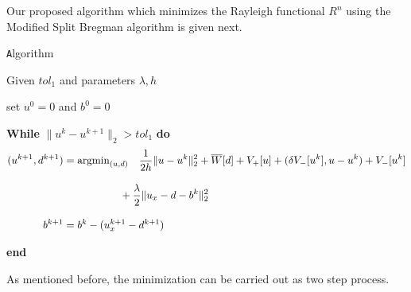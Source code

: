 \documentclass[11pt]{article}
\theoremstyle{plain}
\begin{document}
Our proposed algorithm which minimizes the Rayleigh functional $R^n$ using the Modified Split Bregman algorithm is given next.

\begin{framed}
{\Large \texttt Algorithm}

Given $ tol_1$ and parameters $\lambda,h$


set $u^0=0$ and $b^0=0$



{\bf While} $\|u^k - u^{k+1}\|_2 > tol_1$ {\bf do}
\begin{align*}
(u^{k+1},d^{k+1}) =& \;\mbox{argmin}_{(u,d)}\quad \frac{1}{2h} \|u-u^k\|_2^2 + \overline{W}[d] +V_+[u]+(\delta V_-[u^k],u-u^k) + V_-[u^k] \\[2ex]
&\hspace{10ex}+ \frac{\lambda}{2} \|u_x-d-b^k\|_2^2\\[2ex]
b^{k+1} =&\; b^k - (u_x^{k+1}-d^{k+1})
\end{align*}



{\bf end}
\end{framed}


%
%
%
%
%
%
%
%
%





As mentioned before, the minimization can be carried out as two step process.
\end{document}
